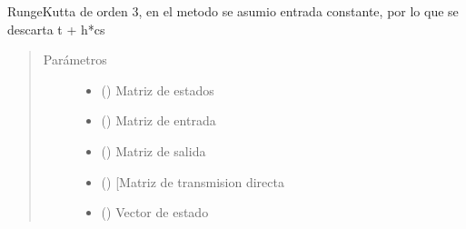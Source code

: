 \documentclass[letterpaper,10pt,spanish]{sphinxmanual}
\begin{document}
\begin{fulllineitems}
\label{\detokenize{codigos/rk_generator:rk_generator.runge_kutta3}}
Runge\sphinxhyphen{}Kutta de orden 3, en el metodo se asumio entrada constante, por lo que se descarta t + h*cs
\begin{quote}\begin{description}
\item[{Parámetros}] \leavevmode\begin{itemize}
\item {} 
 (\sphinxstyleliteralemphasis{\sphinxupquote{, }}\sphinxstyleliteralemphasis{\sphinxupquote{, }}) \textendash{} Matriz de estados

\item {} 
 (\sphinxstyleliteralemphasis{\sphinxupquote{, }}\sphinxstyleliteralemphasis{\sphinxupquote{, }}) \textendash{} Matriz de entrada

\item {} 
 (\sphinxstyleliteralemphasis{\sphinxupquote{, }}\sphinxstyleliteralemphasis{\sphinxupquote{, }}) \textendash{} Matriz de salida

\item {} 
 (\sphinxstyleliteralemphasis{\sphinxupquote{, }}\sphinxstyleliteralemphasis{\sphinxupquote{, }}) \textendash{} {[}Matriz de transmision directa

\item {} 
 (\sphinxstyleliteralemphasis{\sphinxupquote{, }}\sphinxstyleliteralemphasis{\sphinxupquote{, }}) \textendash{} Vector de estado


\end{itemize}
\end{description}
\end{quote}
\end{fulllineitems}
\end{document}
